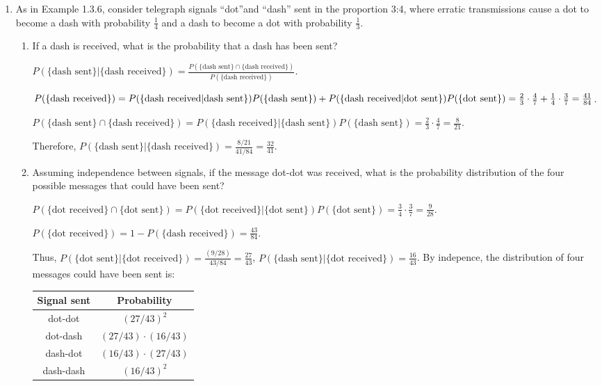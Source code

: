\documentclass[letter]{article}
\begin{document}
\begin{enumerate}[leftmargin = 0 em, label = \arabic*., font = \bfseries]
	\item As in Example 1.3.6, consider telegraph signals ``dot''and ``dash'' sent in the proportion 3:4, where erratic transmissions cause a dot to become a dash with probability $\frac{1}{4}$ and a dash to become a dot with probability $\frac{1}{3}$.
	\begin{enumerate}[leftmargin = 0em]
		\item If a dash is received, what is the probability that a dash has been sent?

		$P(\{\textrm{dash sent}\}|\{\textrm{dash received}\}) = \frac{P(\{\textrm{dash sent}\}\cap \{\textrm{dash received}\})}{P(\{\textrm{dash received}\})}$.

		$P(\{\textrm{dash received}\}) = P(\{\textrm{dash received} | \textrm{dash sent}\}) P(\{\textrm{dash sent}\})+ \\
		P(\{\textrm{dash received}|\textrm{dot sent}\})P(\{\textrm{dot sent}\}) = \frac{2}{3} \cdot \frac{4}{7} + \frac{1}{4} \cdot \frac{3}{7} = \frac{41}{84}$.

		$P(\{\textrm{dash sent}\}\cap \{\textrm{dash received}\}) = P(\{\textrm{dash received}\}|\{\textrm{dash sent}\})P(\{\textrm{dash sent}\}) = \frac{2}{3} \cdot \frac{4}{7} = \frac{8}{21}$. 

		Therefore, $P(\{\textrm{dash sent}\}|\{\textrm{dash received}\}) = \frac{8/21}{41/84} = \frac{32}{41}$.
		\item Assuming independence between signals, if the message dot-dot was received, what is the probability distribution of the four possible messages that could have been sent?

		$P(\{\textrm{dot received}\} \cap \{\textrm{dot sent}\}) = P(\{\textrm{dot received}\}|\{\textrm{dot sent}\})P(\{\textrm{dot sent}\}) = \frac{3}{4} \cdot \frac{3}{7} = \frac{9}{28}$.

		$P(\{\textrm{dot received}\}) = 1 - P(\{\textrm{dash received}\}) = \frac{43}{84}$. 

		Thus, $P(\{\textrm{dot sent}\}|\{\textrm{dot received}\}) = \frac{(9/28)}{43/84} = \frac{27}{43}$, $P(\{\textrm{dash sent}\}|\{\textrm{dot received}\}) = \frac{16}{43}$. By indepence, the distribution of four messages could have been sent is:
		\begin{center}
		\begin{tabular}{cc}
		\toprule
		Signal sent & Probability\\ 
		\midrule
		dot-dot & $(27/43)^2$ \\
		dot-dash & $(27/43)\cdot (16/43)$\\
		dash-dot & $(16/43)\cdot(27/43)$\\
		dash-dash & $(16/43)^2$\\ 
		\bottomrule
		\end{tabular}
		\end{center}
	\end{enumerate}
	

\end{enumerate}
\end{document}
